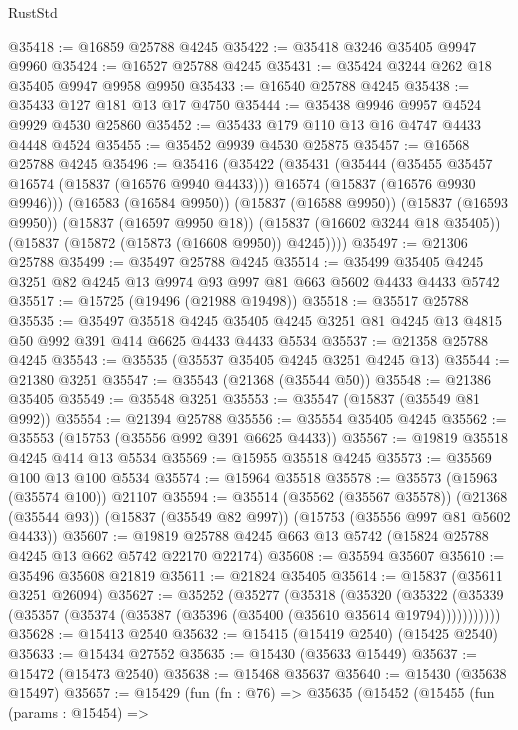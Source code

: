 \begin{lexlean}{RustStd}
\begin{coremodule}
@35418 := @16859 @25788 @4245
@35422 := @35418 @3246 @35405 @9947 @9960
@35424 := @16527 @25788 @4245
@35431 := @35424 @3244 @262 @18 @35405 @9947 @9958 @9950
@35433 := @16540 @25788 @4245
@35438 := @35433 @127 @181 @13 @17 @4750
@35444 := @35438 @9946 @9957 @4524 @9929 @4530 @25860
@35452 := @35433 @179 @110 @13 @16 @4747 @4433 @4448 @4524
@35455 := @35452 @9939 @4530 @25875
@35457 := @16568 @25788 @4245
@35496 := @35416
    (@35422
      (@35431
        (@35444
          (@35455 @35457 @16574 (@15837 (@16576 @9940 @4433)))
          @16574
          (@15837 (@16576 @9930 @9946)))
        (@16583 (@16584 @9950))
        (@15837 (@16588 @9950))
        (@15837 (@16593 @9950))
        (@15837 (@16597 @9950 @18))
        (@15837 (@16602 @3244 @18 @35405))
        (@15837 (@15872 (@15873 (@16608 @9950)) @4245))))
@35497 := @21306 @25788
@35499 := @35497 @25788 @4245
@35514 := @35499 @35405 @4245 @3251 @82 @4245 @13 @9974 @93 @997 @81 @663 @5602 @4433 @4433 @5742
@35517 := @15725 (@19496 (@21988 @19498))
@35518 := @35517 @25788
@35535 := @35497
    @35518
    @4245
    @35405
    @4245
    @3251
    @81
    @4245
    @13
    @4815
    @50
    @992
    @391
    @414
    @6625
    @4433
    @4433
    @5534
@35537 := @21358 @25788 @4245
@35543 := @35535 (@35537 @35405 @4245 @3251 @4245 @13)
@35544 := @21380 @3251
@35547 := @35543 (@21368 (@35544 @50))
@35548 := @21386 @35405
@35549 := @35548 @3251
@35553 := @35547 (@15837 (@35549 @81 @992))
@35554 := @21394 @25788
@35556 := @35554 @35405 @4245
@35562 := @35553 (@15753 (@35556 @992 @391 @6625 @4433))
@35567 := @19819 @35518 @4245 @414 @13 @5534
@35569 := @15955 @35518 @4245
@35573 := @35569 @100 @13 @100 @5534
@35574 := @15964 @35518
@35578 := @35573 (@15963 (@35574 @100)) @21107
@35594 := @35514
    (@35562 (@35567 @35578))
    (@21368 (@35544 @93))
    (@15837 (@35549 @82 @997))
    (@15753 (@35556 @997 @81 @5602 @4433))
@35607 := @19819 @25788 @4245 @663 @13 @5742 (@15824 @25788 @4245 @13 @662 @5742 @22170 @22174)
@35608 := @35594 @35607
@35610 := @35496 @35608 @21819
@35611 := @21824 @35405
@35614 := @15837 (@35611 @3251 @26094)
@35627 := @35252
    (@35277
      (@35318
        (@35320
          (@35322 (@35339 (@35357 (@35374 (@35387 (@35396 (@35400 (@35610 @35614 @19794)))))))))))
@35628 := @15413 @2540
@35632 := @15415 (@15419 @2540) (@15425 @2540)
@35633 := @15434 @27552
@35635 := @15430 (@35633 @15449)
@35637 := @15472 (@15473 @2540)
@35638 := @15468 @35637
@35640 := @15430 (@35638 @15497)
@35657 := @15429
    (fun (fn : @76) =>
    @35635
      (@15452
        (@15455
          (fun (params : @15454) =>

\end{coremodule}
\end{lexlean}
